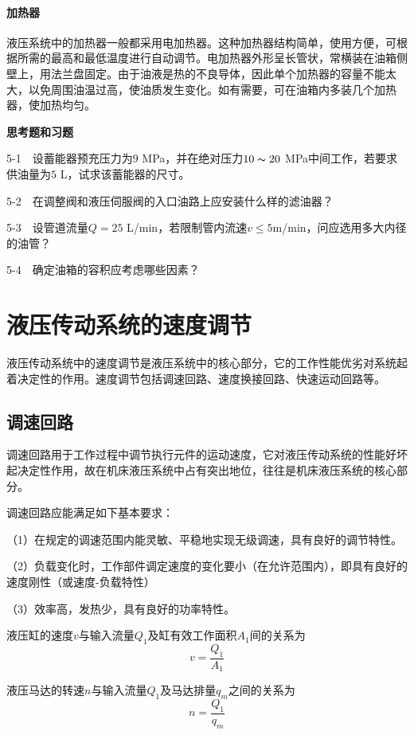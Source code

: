 \subsubsection{加热器}
液压系统中的加热器一般都采用电加热器。这种加热器结构简单，使用方便，可根据所需的最高和最低温度进行自动调节。电加热器外形呈长管状，常横装在油箱侧壁上，用法兰盘固定。由于油液是热的不良导体，因此单个加热器的容量不能太大，以免周围油温过高，使油质发生变化。如有需要，可在油箱内多装几个加热器，使加热均匀。

\begin{center}
 \textbf{思考题和习题}
\end{center}

5-1\ \ 设蓄能器预充压力为$9$ MPa，并在绝对压力$10 \thicksim 20 $ MPa中间工作，若要求供油量为$5$ L，试求该蓄能器的尺寸。

5-2\  \ 在调整阀和液压伺服阀的入口油路上应安装什么样的滤油器？

5-3\  \ 设管道流量$Q = 25 $ L/min，若限制管内流速$v\leq 5$m/min，问应选用多大内径的油管？

5-4\ \ 确定油箱的容积应考虑哪些因素？

\chapter{液压传动系统的速度调节}

液压传动系统中的速度调节是液压系统中的核心部分，它的工作性能优劣对系统起着决定性的作用。速度调节包括调速回路、速度换接回路、快速运动回路等。

\section{调速回路}

调速回路用于工作过程中调节执行元件的运动速度，它对液压传动系统的性能好坏起决定性作用，故在机床液压系统中占有突出地位，往往是机床液压系统的核心部分。

调速回路应能满足如下基本要求：

（1）在规定的调速范围内能灵敏、平稳地实现无级调速，具有良好的调节特性。

（2）负载变化时，工作部件调定速度的变化要小（在允许范围内），即具有良好的速度刚性（或速度-负载特性）

（3）效率高，发热少，具有良好的功率特性。

液压缸的速度$v$与输入流量$Q_{1}$及缸有效工作面积$A_{1}$间的关系为
\[
v = \frac {Q_{1}} {A_{1}}
\]

液压马达的转速$n$与输入流量$Q_{1}$及马达排量$q_{m}$之间的关系为
\[
n = \frac {Q_{1}} {q_{m}}
\]

